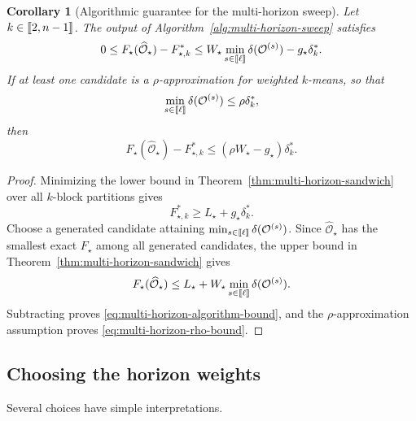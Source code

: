 \documentclass[11pt]{article}
\newtheorem{corollary}[theorem]{Corollary}
\newcommand{\1}{\mathbf{1}}
\providecommand{\llbracket}{\mathopen{[\mkern-2.7mu[}}
\providecommand{\rrbracket}{\mathclose{]\mkern-2.7mu]}}
\begin{document}
\begin{corollary}[Algorithmic guarantee for the multi-horizon sweep]
\label{cor:multi-horizon-algorithm}
Let $k\in\llbracket 2,n-1\rrbracket$.
The output of Algorithm~\ref{alg:multi-horizon-sweep} satisfies
\begin{equation}
    0\leq
    F_\star(\widehat{\mathcal O}_\star)-F_{\star,k}^*
    \leq
    W_\star
    \min_{s\in\llbracket\ell\rrbracket}
      \delta(\mathcal O^{(s)})
    -g_\star\delta_k^*.
    \label{eq:multi-horizon-algorithm-bound}
\end{equation}
If at least one candidate is a $\rho$-approximation for weighted
$k$-means, so that
\[
    \min_{s\in\llbracket\ell\rrbracket}
      \delta(\mathcal O^{(s)})
    \leq\rho\delta_k^*,
\]
then
\begin{equation}
    F_\star(\widehat{\mathcal O}_\star)-F_{\star,k}^*
    \leq(\rho W_\star-g_\star)\delta_k^*.
    \label{eq:multi-horizon-rho-bound}
\end{equation}
\end{corollary}

\begin{proof}
Minimizing the lower bound in
Theorem~\ref{thm:multi-horizon-sandwich} over all $k$-block
partitions gives
\[
    F_{\star,k}^*\geq L_\star+g_\star\delta_k^*.
\]
Choose a generated candidate attaining
$\min_{s\in\llbracket\ell\rrbracket}
\delta(\mathcal O^{(s)})$.  Since
$\widehat{\mathcal O}_\star$ has the smallest exact
$F_\star$ among all generated candidates, the upper bound in
Theorem~\ref{thm:multi-horizon-sandwich} gives
\[
    F_\star(\widehat{\mathcal O}_\star)
    \leq
    L_\star+
    W_\star\min_{s\in\llbracket\ell\rrbracket}
      \delta(\mathcal O^{(s)}).
\]
Subtracting proves \eqref{eq:multi-horizon-algorithm-bound}, and the
$\rho$-approximation assumption proves
\eqref{eq:multi-horizon-rho-bound}.
\end{proof}

\subsection{Choosing the horizon weights}

Several choices have simple interpretations.
\end{document}
